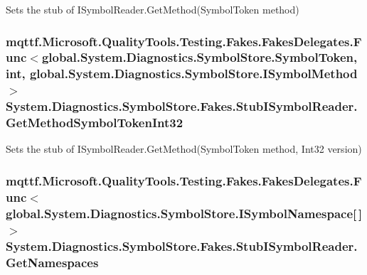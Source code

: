 Sets the stub of I\-Symbol\-Reader.\-Get\-Method(\-Symbol\-Token method)

\hypertarget{class_system_1_1_diagnostics_1_1_symbol_store_1_1_fakes_1_1_stub_i_symbol_reader_a105f48c02dc9f5f6fd4cbd176cffe5e6}{
\subsubsection[{Get\-Method\-Symbol\-Token\-Int32}]{\setlength{\rightskip}{0pt plus 5cm}mqttf.\-Microsoft.\-Quality\-Tools.\-Testing.\-Fakes.\-Fakes\-Delegates.\-Func$<$global.\-System.\-Diagnostics.\-Symbol\-Store.\-Symbol\-Token, int, global.\-System.\-Diagnostics.\-Symbol\-Store.\-I\-Symbol\-Method$>$ System.\-Diagnostics.\-Symbol\-Store.\-Fakes.\-Stub\-I\-Symbol\-Reader.\-Get\-Method\-Symbol\-Token\-Int32}}\label{class_system_1_1_diagnostics_1_1_symbol_store_1_1_fakes_1_1_stub_i_symbol_reader_a105f48c02dc9f5f6fd4cbd176cffe5e6}


Sets the stub of I\-Symbol\-Reader.\-Get\-Method(\-Symbol\-Token method, Int32 version)

\hypertarget{class_system_1_1_diagnostics_1_1_symbol_store_1_1_fakes_1_1_stub_i_symbol_reader_acf2c42b43ed94390a6482c9b443cf488}{
\subsubsection[{Get\-Namespaces}]{\setlength{\rightskip}{0pt plus 5cm}mqttf.\-Microsoft.\-Quality\-Tools.\-Testing.\-Fakes.\-Fakes\-Delegates.\-Func$<$global.\-System.\-Diagnostics.\-Symbol\-Store.\-I\-Symbol\-Namespace\mbox{[}$\,$\mbox{]}$>$ System.\-Diagnostics.\-Symbol\-Store.\-Fakes.\-Stub\-I\-Symbol\-Reader.\-Get\-Namespaces}}\label{class_system_1_1_diagnostics_1_1_symbol_store_1_1_fakes_1_1_stub_i_symbol_reader_acf2c42b43ed94390a6482c9b443cf488}


